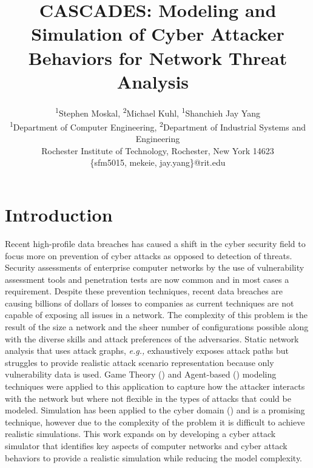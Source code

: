 \documentclass[conference]{IEEEtran}
\newcommand{\eg}  {\emph{e.g., \/}}
\begin{document}
\title{CASCADES: Modeling and Simulation of Cyber Attacker Behaviors for Network Threat Analysis\
\vspace*{-20pt}}

\author{\textsuperscript{1}Stephen Moskal, \textsuperscript{2}Michael Kuhl, \textsuperscript{1}Shanchieh Jay Yang \\
\textsuperscript{1}Department of Computer Engineering, \textsuperscript{2}Department of Industrial Systems and Engineering\\
Rochester Institute of Technology, Rochester, New York 14623\\
\{sfm5015, mekeie, jay.yang\}@rit.edu
}
\maketitle

\section{Introduction}
\label{sec:intro}

Recent high-profile data breaches has caused a shift in the cyber security field to focus more on prevention of cyber attacks as opposed to detection of threats.  Security assessments of enterprise computer networks by the use of vulnerability assessment tools and penetration tests are now common and in most cases a requirement.  Despite these prevention techniques, recent data breaches are causing billions of dollars of losses to companies as current techniques are not capable of exposing all issues in a network.  The complexity of this problem is the result of the size a network and the sheer number of configurations possible along with the diverse skills and attack preferences of the adversaries.  Static network analysis that uses attack graphs, \eg \cite{jha2002two, sheyner2002automated, kotenko2014security, kotenko2015capec} exhaustively exposes attack paths but struggles to provide realistic attack scenario representation because only vulnerability data is used.  Game Theory (\cite{wang2010network, chung2016game}) and Agent-based (\cite{kotenko2005agent,grunewald2011agent}) modeling techniques were applied to this application to capture how the attacker interacts with the network but where not flexible in the types of attacks that could be modeled.  Simulation has been applied to the cyber domain (\cite{grunewald2011agent, moskal2013simulating,moskal2014context}) and is a promising technique, however due to the complexity of the problem it is difficult to achieve realistic simulations.  This work expands on \cite{moskal2014context} by developing a cyber attack simulator that identifies key aspects of computer networks and cyber attack behaviors to provide a realistic simulation while reducing the model complexity.  
\end{document}
